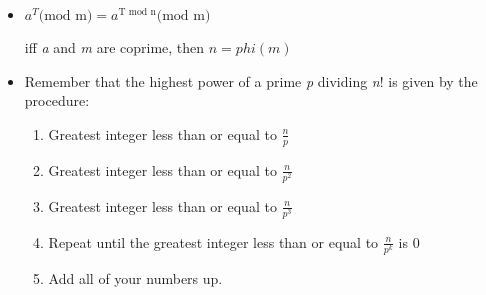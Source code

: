 \begin{itemize}
  \item $a^{T} \text{(mod m)} = a^{\text{T mod n}} \text{(mod m)}$

  iff \textit{a} and \textit{m} are coprime, then $n = phi(m)$

  \item Remember that the highest power of a prime \textit{p} dividing \textit{n}! is given by the procedure:
    \begin{enumerate}
      \item Greatest integer less than or equal to $\frac{n}{p}$

      \item Greatest integer less than or equal to $\frac{n}{p^{2}}$

      \item Greatest integer less than or equal to $\frac{n}{p^{3}}$

      \item Repeat until the greatest integer less than or equal to $\frac{n}{p^{k}}$ is 0

      \item Add all of your numbers up.
    \end{enumerate}


\end{itemize}
